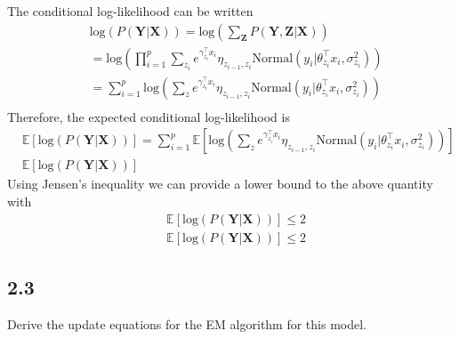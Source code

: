 \documentclass[12pt]{article}
\begin{document}
The conditional log-likelihood can be written
\begin{equation}
    \begin{split}
        &\text{log}(P(\textbf{Y} | \textbf{X})) = \text{log} \left( \sum_{\textbf{Z}} P(\textbf{Y},\textbf{Z} | \textbf{X}) \right) \\
        & = \text{log} \left( \prod_{i=1}^p \sum_{z_i}  e^{\gamma_{z_i}^{\top} x_i} \eta_{z_{i-1},z_i} 
            \text{Normal}(y_i | \theta_{z_i}^{\top} x_i, \sigma_{z_i}^2) \right)\\
        & = \sum_{i=1}^p \text{log} \left( \sum_z e^{\gamma_{z_i}^{\top} x_i} \eta_{z_{i-1},z_i} 
            \text{Normal}(y_i | \theta_{z_i}^{\top} x_i, \sigma_{z_i}^2) \right)\\
    \end{split}
\end{equation}
Therefore, the expected conditional log-likelihood is 
\begin{equation}
    \begin{split}
        &\mathbb{E} \left[ \text{log} (P(\textbf{Y} | \textbf{X})) \right]
            = \sum_{i=1}^p \mathbb{E} \left[ \text{log} \left( \sum_z e^{\gamma_{z_i}^{\top} x_i} \eta_{z_{i-1},z_i} 
            \text{Normal}(y_i | \theta_{z_i}^{\top} x_i, \sigma_{z_i}^2) \right) \right] \\
        &\mathbb{E} \left[ \text{log} (P(\textbf{Y} | \textbf{X})) \right]
    \end{split}
\end{equation}
Using Jensen's inequality we can provide a lower bound to the above quantity with 
\begin{equation}
    \begin{split}
        &\mathbb{E} \left[ \text{log} (P(\textbf{Y} | \textbf{X})) \right] \leq 2\\
        &\mathbb{E} \left[ \text{log} (P(\textbf{Y} | \textbf{X})) \right] \leq 2
    \end{split}
\end{equation}

\subsection*{2.3}
Derive the update equations for the EM algorithm for this model.
\end{document}
